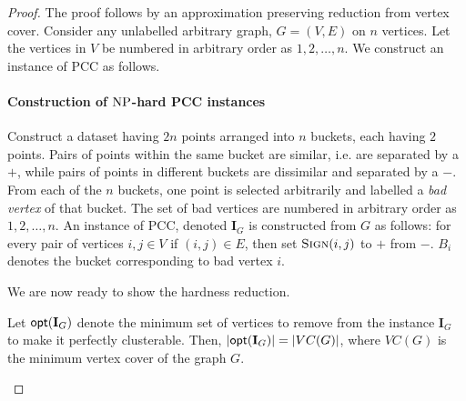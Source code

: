 \begin{proof}
The proof follows by an approximation preserving reduction from vertex cover. Consider any unlabelled arbitrary graph, $G = (V,E)$ on $n$ vertices. Let the vertices in $V$ be numbered in arbitrary order as $1,2,\dots,n$. We construct an instance of PCC as follows.




\paragraph{Construction of $\mathrm{NP}$-hard PCC instances}
Construct a dataset having $2n$ points arranged into $n$ buckets, each having $2$ points. Pairs of points within the same bucket are similar, i.e. are separated by a $+$, while pairs of points in different buckets are dissimilar and separated by a $-$. From each of the $n$ buckets, one point is selected arbitrarily and labelled a \textit{bad vertex} of that bucket. The set of bad vertices are numbered in arbitrary order as $1,2,\dots,n$. An instance of PCC, denoted $\mathbf{I}_G$ is constructed from $G$ as follows: for every pair of vertices $i,j \in V$ if $(i,j) \in E$, then set $\textsc{Sign} (i,j)$ to $+$ from $-$. $B_i$ denotes the bucket corresponding to bad vertex $i$.

We are now ready to show the hardness reduction.

\begin{lemma}
Let $\mathsf{opt} (\mathbf{I}_G)$ denote the minimum set of vertices to remove from the instance $\mathbf{I}_G$ to make it perfectly clusterable. Then, $|\mathsf{opt} (\mathbf{I}_G )| = |VC(G)|$, where $VC(G)$ is the minimum vertex cover of the graph $G$.
\end{lemma}


\end{proof}
